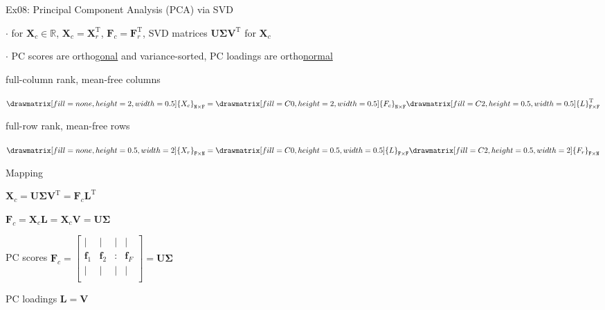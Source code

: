 \documentclass[mathserif, aspectratio=1610]{intbeamer}
\begin{document}
\begin{frame}[t]{Ex08: Principal Component Analysis (PCA) via SVD}

$\cdot$ for $\bm{X}_c \in\mathbb{R}$, $\bm{X}_c = \bm{X}_r^\mathrm{T}$, $\bm{F}_c = \bm{F}_r^\mathrm{T}$, SVD matrices $\bm{U} \bm{\Sigma} \bm{V}^\mathrm{T}$ for $\bm{X}_c$

$\cdot$ PC scores are ortho\underline{gonal} and variance-sorted, PC loadings are ortho\underline{normal}

\vspace{0.5em}
\begin{minipage}[t]{0.49\textwidth}
full-column rank, mean-free columns
\begin{center}
$
\def\F{0.5}
\def\N{2}
\drawmatrix[fill=none, height=\N, width=\F]{X_{c}}_\mathtt{N \times F}
=
\drawmatrix[fill=C0, height=\N, width=\F]{F_{c}}_\mathtt{N \times F}
\drawmatrix[fill=C2, height=\F, width=\F]{L}_\mathtt{F \times F}^\mathrm{T}
$
\end{center}
\end{minipage}
%
\begin{minipage}[t]{0.49\textwidth}
full-row rank, mean-free rows
\begin{center}
$
\def\F{0.5}
\def\N{2}
\drawmatrix[fill=none, height=\F, width=\N]{X_{r}}_\mathtt{F \times N}
=
\drawmatrix[fill=C0, height=\F, width=\F]{L}_\mathtt{F \times F}
\drawmatrix[fill=C2, height=\F, width=\N]{F_{r}}_\mathtt{F \times N}
$
\end{center}
\end{minipage}

\begin{minipage}[t]{0.49\textwidth}

Mapping

$\bm{X}_c= \bm{U} \bm{\Sigma} \bm{V}^\mathrm{T} = \bm{F}_c \bm{L}^\mathrm{T}$

$\bm{F}_c = \bm{X}_c \bm{L} = \bm{X}_c \bm{V} = \bm{U} \bm{\Sigma}$

PC scores $\bm{F}_c =
\begin{bmatrix}
| & | & | & |\\
\bm{f}_1 & \bm{f}_2 & : & \bm{f}_F\\
| & | & | & |\\
\end{bmatrix}
= \bm{U} \bm{\Sigma}$

PC loadings $\bm{L} = \bm{V}$


\end{minipage}
%
\begin{minipage}[t]{0.49\textwidth}


\end{minipage}
\end{frame}
\end{document}
